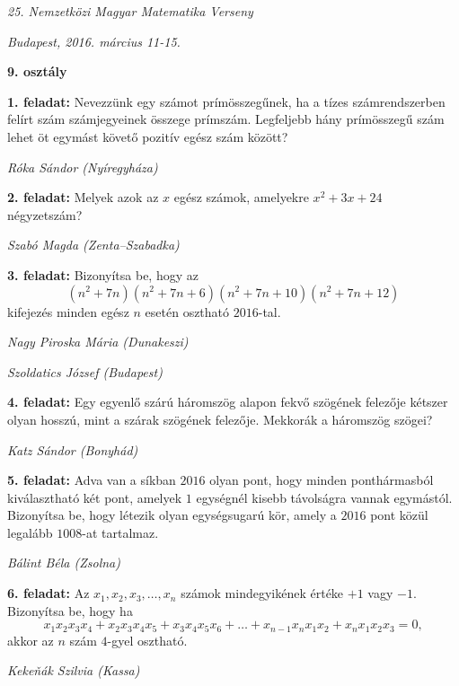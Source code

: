 \documentclass[a4paper,10pt]{article}
\newcommand{\ki}[2]{\hfill {\it #1 (#2)}\medskip}
\begin{document}
\begin{center} \Large {\em 25. Nemzetközi Magyar Matematika Verseny} \end{center}
\begin{center} \large{\em Budapest, 2016. március 11-15.} \end{center}
\smallskip
\begin{center} \large{\bf 9. osztály} \end{center}
\bigskip 

{\bf 1. feladat: } Nevezzünk egy számot prímösszegűnek, ha a tízes számrendszerben felírt szám számjegyeinek összege prímszám. Legfeljebb hány prímösszegű szám lehet öt egymást követő pozitív egész szám között?

\ki{Róka Sándor}{Nyíregyháza}\medskip

{\bf 2. feladat: } Melyek azok az $x$ egész számok, amelyekre $x^2+3x+24$ négyzetszám?

\ki{Szabó Magda}{Zenta--Szabadka}\medskip

{\bf 3. feladat: } Bizonyítsa be, hogy az 
\[(n^2+7n)(n^2+7n+6)(n^2+7n+10)(n^2+7n+12)\] 
kifejezés minden egész $n$ esetén osztható $2016$-tal.


\ki{Nagy Piroska Mária}{Dunakeszi}

\ki{Szoldatics József}{Budapest}\medskip

{\bf 4. feladat: } Egy egyenlő szárú háromszög alapon fekvő szögének felezője kétszer olyan hosszú, mint a szárak szögének felezője. Mekkorák a háromszög szögei?

\ki{Katz Sándor}{Bonyhád}\medskip

{\bf 5. feladat: } Adva van a síkban $2016$ olyan pont, hogy minden ponthármasból kiválasztható két pont, amelyek $1$ egységnél kisebb távolságra vannak egymástól. Bizonyítsa be, hogy létezik olyan egységsugarú kör, amely a $2016$ pont közül legalább $1008$-at tartalmaz.

\ki{Bálint Béla}{Zsolna}\medskip

{\bf 6. feladat: } Az $x_1, x_2, x_3, \ldots, x_n$ számok mindegyikének értéke $+1$ vagy $-1$. 
Bizonyítsa be, hogy ha  
\[x_1x_2x_3x_4+x_2x_3x_4x_5+x_3x_4x_5x_6+\ldots+x_{n-1}x_nx_1x_2+x_nx_1x_2x_3=0,\] 
akkor az $n$ szám $4$-gyel osztható.

\ki{Keke\v{n}ák Szilvia}{Kassa}\medskip
\end{document}
